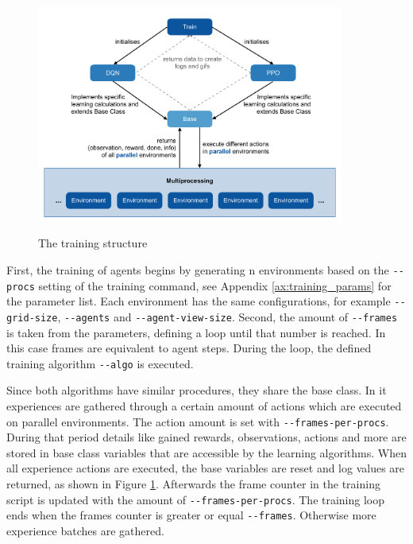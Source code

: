 \begin{figure}[hpbt]
    \centering
    \includegraphics[width=0.9\textwidth]{pictures/training}\\
    \caption[The Training Structure]{The training structure}\label{fig:training}
\end{figure}

First, the training of agents begins by generating n environments based on the \verb|--procs| setting of the training command, see Appendix \ref{ax:training_params} for the parameter list. Each environment has the same configurations, for example \verb|--grid-size|, \verb|--agents| and \verb|--agent-view-size|. Second, the amount of \verb|--frames| is taken from the parameters, defining a loop until that number is reached. In this case frames are equivalent to agent steps. During the loop, the defined training algorithm \verb|--algo| is executed.

Since both algorithms have similar procedures, they share the base class. In it experiences are gathered through a certain amount of actions which are executed on parallel environments. The action amount is set with \verb|--frames-per-procs|. During that period details like gained rewards, observations, actions and more are stored in base class variables that are accessible by the learning algorithms. When all experience actions are executed, the base variables are reset and log values are returned, as shown in Figure \ref{fig:training}. Afterwards the frame counter in the training script is updated with the amount of \verb|--frames-per-procs|. The training loop ends when the frames counter is greater or equal \verb|--frames|. Otherwise more experience batches are gathered.

